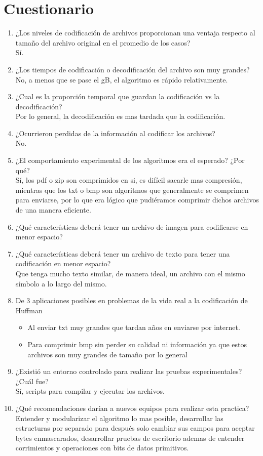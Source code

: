 \documentclass[12 pt]{report}
\begin{document}
\section{Cuestionario}
\begin{enumerate}
\item ¿Los niveles de codificación de archivos proporcionan una ventaja respecto al tamaño del archivo original en el promedio de los casos?\\
  Sí.
\item ¿Los tiempos de codificación o decodificación del archivo son muy grandes?\\
  No, a menos que se pase el gB, el algoritmo es rápido relativamente.
\item ¿Cual es la proporción temporal que guardan la codificación vs la decodificación?\\
  Por lo general, la decodificación es mas tardada que la codificación.
\item ¿Ocurrieron perdidas de la información al codificar los archivos?\\
  No.
\item ¿El comportamiento experimental de los algoritmos era el esperado? ¿Por qué?\\
  Sí, los pdf o zip son comprimidos en si, es difícil sacarle mas compresión, mientras que los txt o bmp son algoritmos que generalmente se comprimen para enviarse, por lo que era lógico que pudiéramos comprimir dichos archivos de una manera eficiente.
\item ¿Qué características deberá tener un archivo de imagen para codificarse en menor espacio?\\  
\item ¿Qué características deberá tener un archivo de texto para tener una codificación en menor espacio?\\
  Que tenga mucho texto similar, de manera ideal, un archivo con el mismo símbolo a lo largo del mismo.
\item De 3 aplicaciones posibles en problemas de la vida real a la codificación de Huffman\\
  \begin{itemize}
  \item Al enviar txt muy grandes que tardan años en enviarse por internet.
  \item Para comprimir bmp sin perder su calidad ni información ya que estos archivos son muy grandes de tamaño por lo general
  \end{itemize}
\item ¿Existió un entorno controlado para realizar las pruebas experimentales? ¿Cuál fue?\\
  Sí, scripts para compilar y ejecutar los archivos.
\item ¿Qué recomendaciones darían a nuevos equipos para realizar esta practica?\\
  Entender y modularizar el algoritmo lo mas posible, desarrollar las estructuras por separado para después solo cambiar sus campos para aceptar bytes enmascarados, desarrollar pruebas de escritorio ademas de entender corrimientos y operaciones con bits de datos primitivos.
\end{enumerate}
\end{document}
